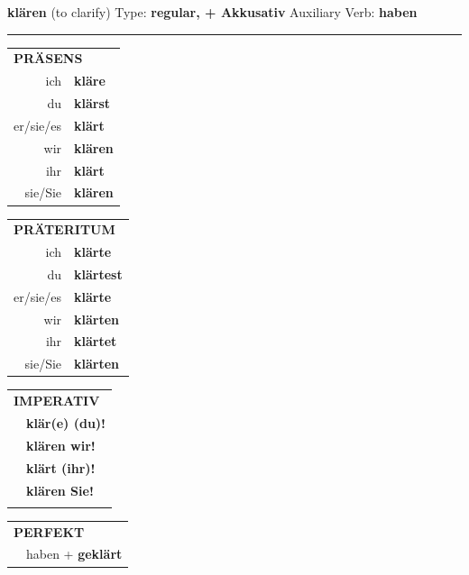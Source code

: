 \documentclass[10pt,a4paper]{revtex4-2}
\begin{document}
\begin{verbbox-acc}
    {\Large \bf klären} (to clarify) \hfill Type: \textbf{regular, + Akkusativ} \hfill Auxiliary Verb: \textbf{haben} 
    
     \vspace{5pt}

    \hrule
    
    \vspace{5pt}

  \begin{tabular}{rl}
     \multicolumn{2}{l}{\textbf{PRÄSENS} }\\
    ich & \textbf{kläre}\\
    du & \textbf{klärst}\\
    er/sie/es & \textbf{klärt}\\
    wir & \textbf{klären}\\
    ihr & \textbf{klärt}\\
    sie/Sie & \textbf{klären}\\
  \end{tabular}
  \hfill
     \begin{tabular}{rl}
    \multicolumn{2}{l}{\textbf{PRÄTERITUM} }\\
    ich & \textbf{klärte}\\
    du & \textbf{klärtest}\\
    er/sie/es & \textbf{klärte}\\
    wir & \textbf{klärten}\\
    ihr & \textbf{klärtet}\\
    sie/Sie & \textbf{klärten}\\
  \end{tabular}
  \hfill
  \begin{tabular}{rl}
     \multicolumn{2}{l}{\textbf{IMPERATIV} }\\
   & \textbf{klär(e) (du)!}\\
   & \textbf{klären wir!}\\
   & \textbf{klärt (ihr)!}\\
   & \textbf{klären Sie!}\\
   & \vspace{10pt}
  \end{tabular}

    \vspace{10pt}

 \begin{tabular}{rl}
     \multicolumn{2}{l}{\textbf{PERFEKT}}\\
   & haben + \textbf{geklärt}\\
  \end{tabular}
\hfill
   \begin{tabular}{rl}
   

\end{tabular}
\end{verbbox-acc}
\end{document}
